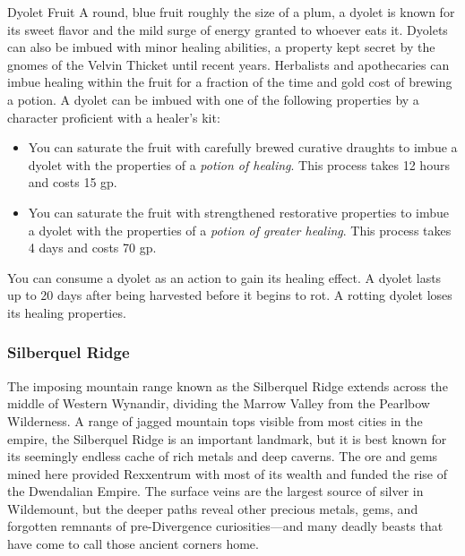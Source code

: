 \documentclass[10pt,a4paper,twoside,bg=print,twocolumn,openany,nodeprecatedcode]{dndbook}
\begin{document}
\begin{DndSidebar}[float=!b]{Dyolet Fruit}
A round, blue fruit roughly the size of a plum, a dyolet is known for its sweet flavor and the mild surge of energy granted to whoever eats it. Dyolets can also be imbued with minor healing abilities, a property kept secret by the gnomes of the Velvin Thicket until recent years. Herbalists and apothecaries can imbue healing within the fruit for a fraction of the time and gold cost of brewing a potion. A dyolet can be imbued with one of the following properties by a character proficient with a healer's kit:




\begin{itemize}
\item You can saturate the fruit with carefully brewed curative draughts to imbue a dyolet with the properties of a \textit{potion of healing}. This process takes 12 hours and costs 15 gp.
\item You can saturate the fruit with strengthened restorative properties to imbue a dyolet with the properties of a \textit{potion of greater healing}. This process takes 4 days and costs 70 gp.
\end{itemize}



You can consume a dyolet as an action to gain its healing effect. A dyolet lasts up to 20 days after being harvested before it begins to rot. A rotting dyolet loses its healing properties.



\end{DndSidebar}

\subsubsection{Silberquel Ridge}
The imposing mountain range known as the Silberquel Ridge extends across the middle of Western Wynandir, dividing the Marrow Valley from the Pearlbow Wilderness. A range of jagged mountain tops visible from most cities in the empire, the Silberquel Ridge is an important landmark, but it is best known for its seemingly endless cache of rich metals and deep caverns. The ore and gems mined here provided Rexxentrum with most of its wealth and funded the rise of the Dwendalian Empire. The surface veins are the largest source of silver in Wildemount, but the deeper paths reveal other precious metals, gems, and forgotten remnants of pre-Divergence curiosities—and many deadly beasts that have come to call those ancient corners home.
\end{document}
